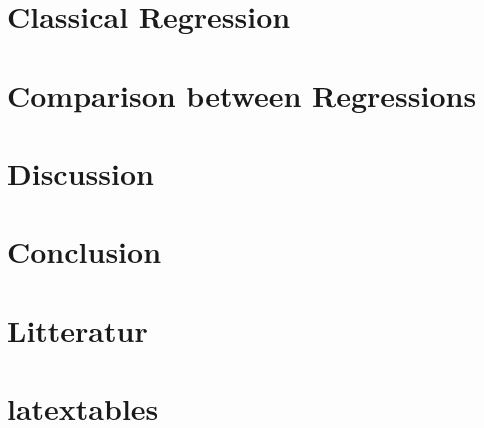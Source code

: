 \documentclass{article}
\begin{document}
	\section{Classical Regression}
	\newpage
	
	
%	
	
	
%	
	
	
	\section{Comparison between Regressions}
	
	\newpage
	
	\section{Discussion}
	
	\newpage
	
	\section{Conclusion}
	
	\newpage
	
 	\section{Litteratur}
 	
 	\section{latextables}
 	\newpage
  
\end{document}
